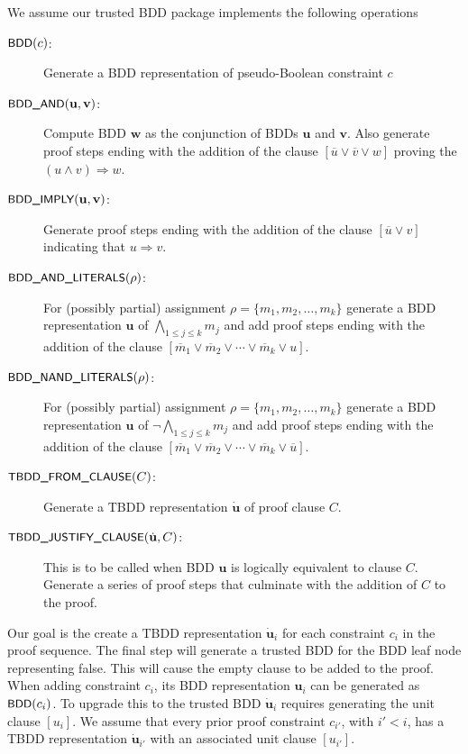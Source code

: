 \documentclass{easychair}
\newcommand{\boolnot}{\neg}
\renewcommand{\obar}[1]{\overline{#1}}
\newcommand{\mlit}{m}
\newcommand{\trust}[1]{\dot {#1}}
\newcommand{\assign}{\rho}
\newcommand{\imply}{\Rightarrow}
\newcommand{\fname}[1]{\mbox{\small\sf #1}}
\newcommand{\node}[1]{\mathbf{#1}}
\newcommand{\nodeu}{\node{u}}
\newcommand{\nodev}{\node{v}}
\newcommand{\nodew}{\node{w}}
\begin{document}
We assume our trusted BDD package implements the following operations
\begin{description}
\item[$\fname{BDD}(c)$:] Generate a BDD representation of pseudo-Boolean constraint $c$
\item[$\fname{BDD\_AND}(\nodeu, \nodev)$:] Compute BDD $\nodew$ as the conjunction of BDDs $\nodeu$ and $\nodev$.  Also generate proof steps ending with the addition of the clause $[\obar{u} \lor \obar{v} \lor w]$ proving the $(u \land v) \imply w$.
\item[$\fname{BDD\_IMPLY}(\nodeu, \nodev)$:]
  Generate proof steps ending with the addition of the clause $[\obar{u} \lor v]$ indicating that $u \imply v$.
\item[$\fname{BDD\_AND\_LITERALS}(\assign)$:] For (possibly partial) assignment $\assign = \{\mlit_1, \mlit_2, \ldots, \mlit_k\}$
  generate a BDD representation $\nodeu$ of $\bigwedge_{1 \leq j \leq k} \mlit_j$ and add
  proof steps ending with the addition of the clause $[\obar{\mlit}_1 \lor \obar{\mlit}_2 \lor \cdots \lor \obar{\mlit}_k \lor u]$.
\item[$\fname{BDD\_NAND\_LITERALS}(\assign)$:] For (possibly partial) assignment $\assign = \{\mlit_1, \mlit_2, \ldots, \mlit_k\}$
  generate a BDD representation $\nodeu$ of $\boolnot \bigwedge_{1 \leq j \leq k} \mlit_j$ and add
  proof steps ending with the addition of the clause $[\obar{\mlit}_1 \lor \obar{\mlit}_2 \lor \cdots \lor \obar{\mlit}_k \lor \obar{u}]$.
\item[$\fname{TBDD\_FROM\_CLAUSE}(C)$:] Generate a TBDD representation $\trust{\nodeu}$ of proof clause $C$.
\item[$\fname{TBDD\_JUSTIFY\_CLAUSE}(\trust{\nodeu}, C)$:]
This is to be called when BDD $\nodeu$ is logically equivalent to clause $C$.
Generate a series of proof steps that culminate with the addition of $C$ to the proof.
\end{description}

Our goal is the create a TBDD representation $\trust{\nodeu}_i$ for
each constraint $c_i$ in the proof sequence.  The final step will
generate a trusted BDD for the BDD leaf node representing false.  This
will cause the empty clause to be added to the proof.
When adding constraint $c_i$, its BDD
representation $\nodeu_i$ can be generated as $\fname{BDD}(c_i)$.  To upgrade
this to the trusted BDD $\trust{\nodeu}_i$ requires generating the unit clause $[u_i]$.
We assume that every prior proof constraint $c_{i'}$, with $i' < i$, has a TBDD representation $\trust{\nodeu}_{i'}$ with an associated unit clause
$[u_{i'}]$.
\end{document}
